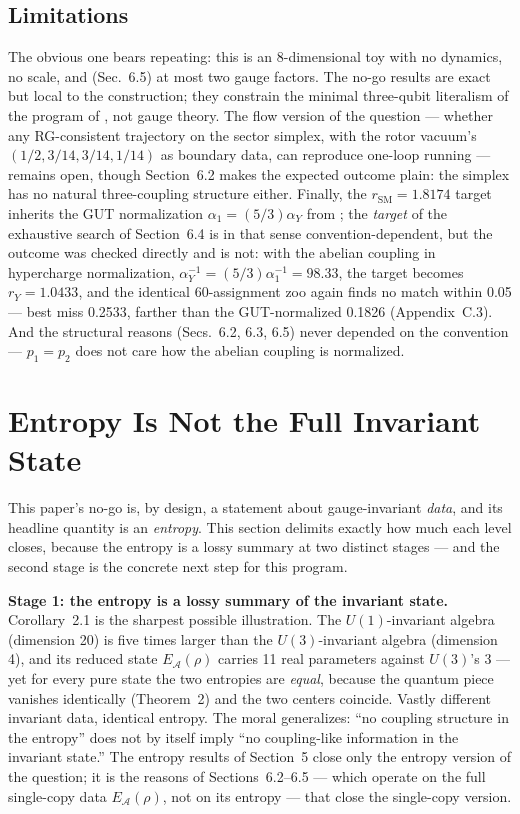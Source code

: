 \documentclass[11pt]{article}
\newcommand{\EA}{E_{\mathcal{A}}}
\newcommand{\rSM}{r_{\mathrm{SM}}}
\newcommand{\rY}{r_{Y}}
\begin{document}
\subsection{Limitations}

The obvious one bears repeating: this is an 8-dimensional toy with no dynamics, no scale, and (Sec.~6.5) at most two gauge factors. The no-go results are exact but local to the construction; they constrain the minimal three-qubit literalism of the program of \cite{companion}, not gauge theory. The flow version of the question --- whether any RG-consistent trajectory on the sector simplex, with the rotor vacuum's $(1/2, 3/14, 3/14, 1/14)$ as boundary data, can reproduce one-loop running --- remains open, though Section~6.2 makes the expected outcome plain: the simplex has no natural three-coupling structure either. Finally, the $\rSM = 1.8174$ target inherits the GUT normalization $\alpha_1 = (5/3)\alpha_Y$ from \cite{companion}; the \emph{target} of the exhaustive search of Section~6.4 is in that sense convention-dependent, but the outcome was checked directly and is not: with the abelian coupling in hypercharge normalization, $\alpha_Y^{-1} = (5/3)\alpha_1^{-1} = 98.33$, the target becomes $\rY = 1.0433$, and the identical 60-assignment zoo again finds no match within 0.05 --- best miss 0.2533, farther than the GUT-normalized 0.1826 (Appendix~C.3). And the structural reasons (Secs.~6.2, 6.3, 6.5) never depended on the convention --- $p_1 = p_2$ does not care how the abelian coupling is normalized.

\section{Entropy Is Not the Full Invariant State}

This paper's no-go is, by design, a statement about gauge-invariant \emph{data}, and its headline quantity is an \emph{entropy}. This section delimits exactly how much each level closes, because the entropy is a lossy summary at two distinct stages --- and the second stage is the concrete next step for this program.

\textbf{Stage 1: the entropy is a lossy summary of the invariant state.} Corollary~2.1 is the sharpest possible illustration. The $U(1)$-invariant algebra (dimension 20) is five times larger than the $U(3)$-invariant algebra (dimension 4), and its reduced state $\EA(\rho)$ carries 11 real parameters against $U(3)$'s 3 --- yet for every pure state the two entropies are \emph{equal}, because the quantum piece vanishes identically (Theorem~2) and the two centers coincide. Vastly different invariant data, identical entropy. The moral generalizes: ``no coupling structure in the entropy'' does not by itself imply ``no coupling-like information in the invariant state.'' The entropy results of Section~5 close only the entropy version of the question; it is the reasons of Sections~6.2--6.5 --- which operate on the full single-copy data $\EA(\rho)$, not on its entropy --- that close the single-copy version.
\end{document}
